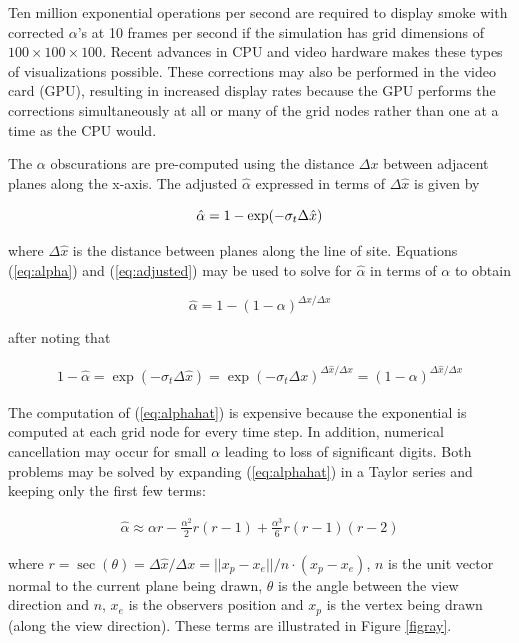 {Ten million exponential operations per second are required to display smoke with corrected $\alpha$'s at 10 frames per second if the simulation has grid dimensions of $100\times 100\times 100$. Recent advances in CPU and video hardware makes these types of visualizations possible. These corrections may also be performed in the video card (GPU), resulting in increased display rates because the GPU performs the corrections simultaneously at all or many of the grid nodes rather than one at a time as the CPU would.

The $\alpha$ obscurations are pre-computed using the distance $\Delta x$ between adjacent planes along the x-axis. The adjusted $\hat{\alpha}$ expressed in terms of $\Delta\hat{x}$ is given by

\begin{equation}
\label{eq:adjusted}
\hat{\alpha}=1-\exp(-\sigma_t\Delta \hat{x})\\
\end{equation}

where $\Delta\hat{x}$ is the distance between planes along the line of site.  Equations (\ref{eq:alpha}) and (\ref{eq:adjusted}) may be used to solve for $\hat{\alpha}$ in terms of $\alpha$ to obtain

\begin{equation}
\label{eq:alphahat}
\hat{\alpha}=1-(1-\alpha)^{\Delta\hat{x}/\Delta x}
\end{equation}

after noting that

\begin{eqnarray*}
1-\hat{\alpha}=\exp(-\sigma_t\Delta\hat{x})=\exp(-\sigma_t\Delta
x)^{\Delta\hat{x}/\Delta x}=(1-\alpha)^{\Delta\hat{x}/\Delta x}
\end{eqnarray*}

The computation of (\ref{eq:alphahat}) is expensive because the exponential is computed at each grid node for every time step.  In addition, numerical cancellation may occur for small $\alpha$ leading to loss of significant digits. Both problems may be solved by expanding (\ref{eq:alphahat}) in a Taylor series and keeping only the first few terms:

\begin{eqnarray*}
\hat{\alpha}\approx \alpha r -
\frac{\alpha^2}{2}r(r-1)+\frac{\alpha^3}{6}r(r-1)(r-2)
\end{eqnarray*}

where $r=\sec(\theta)=\Delta \hat{x}/\Delta x=||x_p-x_e||/n\cdot(x_p-x_e)$, $n$ is the unit vector normal to the current plane being drawn, $\theta$ is the angle between the view direction and $n$, $x_e$ is the observers position and $x_p$ is the vertex being drawn (along the view direction).  These terms are illustrated in Figure \ref{figray}.

}
